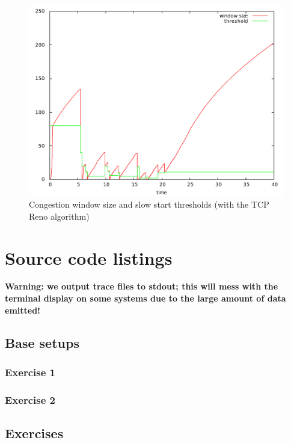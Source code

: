 \documentclass[10pt,a4paper]{article}
\begin{document}
\begin{figure}[p]
    \centering
    \includegraphics[width=\textwidth]{../part2/q4/plots/algorithm.pdf}
    \caption{Congestion window size and slow start thresholds (with
      the TCP Reno algorithm)}
    \label{fig:aimd_reno}
\end{figure}


\newpage
\section{Source code listings}

\textbf{Warning: we output trace files to stdout; this will mess with
  the terminal display on some systems due to the large amount of data
emitted!}

\subsection{Base setups}
\subsubsection{Exercise 1}

\subsubsection{Exercise 2}


\subsection{Exercises}
\end{document}
